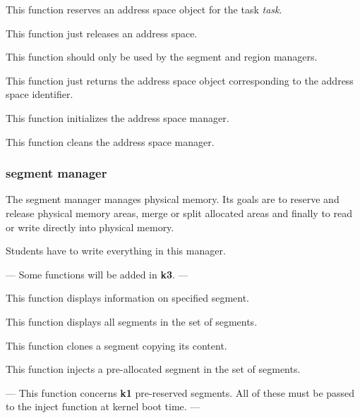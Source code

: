 	  {This function reserves an address space object for the
	    task \textit{task}.}

	  {This function just releases an address space.}

	  {This function should only be used by the segment and region
	    managers.

	    This function just returns the address space object
	    corresponding to the address space identifier.}

	  {This function initializes the address space manager.}

	  {This function cleans the address space manager.}

%
%

\subsubsection{segment manager}

The segment manager manages physical memory. Its goals are to reserve
and release physical memory areas, merge or split allocated areas and finally
to read or write directly into physical memory.

Students have to write everything in this manager.

---
Some functions will be added in \textbf{k3}.
---

	  {This function displays information on specified segment.}

	  {This function displays all segments in the set of segments.}

	  {This function clones a segment copying its content.}

	  {This function injects a pre-allocated segment in the set of
	    segments.

	    ---
	    This function concerns \textbf{k1} pre-reserved segments.
	    All of these must be passed to the inject function at kernel
	    boot time.
	    ---}

